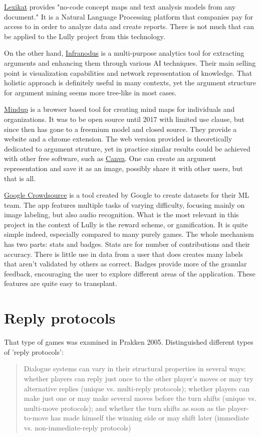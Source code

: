 \documentclass{report}
\begin{document}
\href{https://lexikat.com/#/}{Lexikat} provides "no-code concept maps and text analysis models from any document." It is a Natural Language Processing platform that companies pay for access to in order to analyze data and create reports. There is not much that can be applied to the Lully project from this technology.

On the other hand, \href{https://infranodus.com/}{Infranodus} is a multi-purpose analytics tool for extracting arguments and enhancing them through various AI techniques. Their main selling point is visualization capabilities and network representation of knowledge. That holistic approach is definitely useful in many contexts, yet the argument structure for argument mining seems more tree-like in most cases.

\href{https://www.mindmup.com/}{Mindup} is a browser based tool for creating mind maps for individuals and organizations. It was to be open source until 2017 with limited use clause, but since then has gone to a freemium model and closed source. They provide a website and a chrome extension. The web version provided is theoretically dedicated to argument struture, yet in practice similar results could be achieved with other free software, such as \href{https://www.canva.com/}{Canva}. One can create an argument representation and save it as an image, possibly share it with other users, but that is all.

\href{https://en.wikipedia.org/wiki/Crowdsource_(app)}{Google Crowdsource} is a tool created by Google to create datasets for their ML team. The app features multiple tasks of varying difficulty, focusing mainly on image labeling, but also audio recognition. What is the most relevant in this project in the context of Lully is the reward scheme, or gamification. It is quite simple indeed, especially compared to many purely games. The whole mechanism has two parts: stats and badges. Stats are for number of contributions and their accuracy. There is little use in data from a user that does creates many labels that aren't validated by others as correct. Badges provide more of the granular feedback, encouraging the user to explore different areas of the application. These features are quite easy to transplant.

\section{Reply protocols}
That type of games was examined in Prakken 2005. Distinguished different types of 'reply protocols':
\begin{quotation}
  Dialogue systems can vary in their structural properties
in several ways: whether players can reply just once to the other player’s moves or may try
alternative replies (unique vs. multi-reply protocols); whether players can make just one or may
make several moves before the turn shifts (unique vs. multi-move protocols); and whether the turn
shifts as soon as the player-to-move has made himself the winning side or may shift later (immediate
vs. non-immediate-reply protocols)
\end{quotation}
\cite[page 1010]{prakken_coherence_2005}
\end{document}
